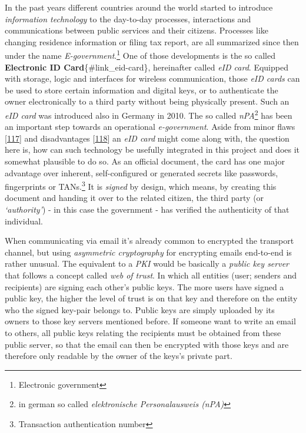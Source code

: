 \documentclass[12pt,english,a4paper,titlepage,cleardoublepage=empty,dottedtoc]{report}
\begin{document}
In the past years different countries around the world started to
introduce \emph{information technology} to the day-to-day processes,
interactions and communications between public services and their
citizens. Processes like changing residence information or filing tax
report, are all summarized since then under the name
\emph{E-government}.\footnote{Electronic government} One of those
developments is the so called \textbf{Electronic ID
Card}\{\#link\_eid-card\}, hereinafter called \emph{eID card}. Equipped
with storage, logic and interfaces for wireless communication, those
\emph{eID cards} can be used to store certain information and digital
keys, or to authenticate the owner electronically to a third party
without being physically present. Such an \emph{eID card} was introduced
also in Germany in 2010. The so called \emph{nPA}\footnote{in german so
  called \emph{elektronische Personalausweis (nPA)}} has been an
important step towards an operational \emph{e-government}. Aside from
minor flaws
{[}\protect\hyperlink{ref-web_2013_npa-sicherheitsdefizit}{117}{]} and
disadvantages
{[}\protect\hyperlink{ref-web_2014_test-qes-support-in-npa}{118}{]} an
\emph{eID card} might come along with, the question here is, how can
such technology be usefully integrated in this project and does it
somewhat plausible to do so. As an official document, the card has one
major advantage over inherent, self-configured or generated secrets like
passwords, fingerprints or TANs.\footnote{Transaction authentication
  number} It is \emph{signed} by design, which means, by creating this
document and handing it over to the related citizen, the third party (or
\emph{`authority'}) - in this case the government - has verified the
authenticity of that individual.

When communicating via email it's already common to encrypted the
transport channel, but using \emph{asymmetric cryptography} for
encrypting emails end-to-end is rather unusual. The equivalent to a
\emph{PKI} would be basically a \emph{public key server} that follows a
concept called \emph{web of trust}. In which all entities (user; senders
and recipients) are signing each other's public keys. The more users
have signed a public key, the higher the level of trust is on that key
and therefore on the entity who the signed key-pair belongs to. Public
keys are simply uploaded by its owners to those key servers mentioned
before. If someone want to write an email to others, all public keys
relating the recipients must be obtained from these public server, so
that the email can then be encrypted with those keys and are therefore
only readable by the owner of the keys's private part.
\end{document}
